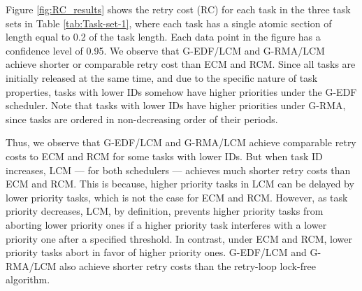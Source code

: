 Figure \ref{fig:RC_results} shows the retry cost (RC) 
for each task in the three task sets in Table \ref{tab:Task-set-1}, where each task has a single atomic section of length equal to 0.2 of the task length. Each data point in the figure has a confidence level of 0.95. We observe that G-EDF/LCM and G-RMA/LCM achieve shorter
or comparable retry cost than ECM and RCM. Since all tasks are initially
released at the same time, and due to the specific nature of task properties, tasks with lower IDs somehow have higher priorities under the G-EDF scheduler. Note that tasks with lower IDs have higher priorities under G-RMA, since tasks are ordered in non-decreasing order of their periods. 

Thus, we observe that G-EDF/LCM and G-RMA/LCM achieve comparable retry costs
to ECM and RCM for some tasks with lower IDs. But when task ID increases,
LCM --- for both schedulers --- achieves much shorter retry costs 
than ECM and RCM. 
This is because, higher priority tasks in LCM can be delayed by lower priority tasks, which is not the case for ECM and RCM. However, as task priority decreases, LCM, by definition, prevents higher priority
tasks from aborting lower priority ones if a higher priority task
interferes with a lower priority one after a specified threshold. In contrast, under ECM and RCM, lower priority tasks abort in favor of higher priority ones. G-EDF/LCM and G-RMA/LCM also achieve shorter retry costs than the retry-loop lock-free algorithm.

